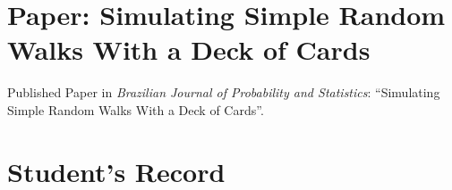 \documentclass[12pt]{report}
\begin{document}


\chapter{Paper: Simulating Simple Random Walks With a Deck of Cards }
\label{App: Cards}

Published Paper in \textit{Brazilian Journal of Probability and Statistics}: \enquote{Simulating Simple Random Walks With a Deck of Cards}.



\chapter{Student's Record}


\end{document}
